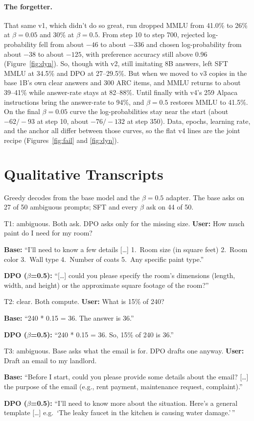 \documentclass[11pt]{article}
\newcommand{\usr}[1]{\textbf{User:} #1\par}
\newcommand{\base}[1]{\textbf{Base:} #1\par}
\newcommand{\dpo}[1]{\textbf{DPO ($\beta$=0.5):} #1\par}
\begin{document}
\paragraph{The forgetter.}
That same v1, which didn't do so great, run dropped MMLU from 41.0\% to 26\% at $\beta{=}0.05$ and 30\% at $\beta{=}0.5$.
From step 10 to step 700, rejected log-probability fell from about $-46$ to about $-336$ and chosen log-probability from about $-38$ to about $-125$, with preference accuracy still above 0.96 (Figure~\ref{fig:dyn}).
So, though with v2, still imitating 8B answers, left SFT MMLU at 34.5\% and DPO at 27--29.5\%.
But when we moved to v3 copies in the base 1B's own clear answers and 300 ARC items, and MMLU returns to about 39--41\% while answer-rate stays at 82--88\%.
Until finally with v4's 259 Alpaca instructions bring the answer-rate to 94\%, and $\beta{=}0.5$ restores MMLU to 41.5\%.
On the final $\beta{=}0.05$ curve the log-probabilities stay near the start (about $-62/-93$ at step 10, about $-76/-132$ at step 350).
Data, epochs, learning rate, and the anchor all differ between those curves, so the flat v4 lines are the joint recipe (Figures~\ref{fig:fail} and \ref{fig:dyn}).

\section{Qualitative Transcripts}
\label{sec:transcripts}

Greedy decodes from the base model and the $\beta{=}0.5$ adapter. The base asks on 27 of 50 ambiguous prompts; SFT and every $\beta$ ask on 44 of 50.

\begin{transcript}{T1: ambiguous. Both ask. DPO asks only for the missing size.}
\usr{How much paint do I need for my room?}
\base{``I'll need to know a few details [\dots] 1.~Room size (in square feet) 2.~Room color 3.~Wall type 4.~Number of coats 5.~Any specific paint type.''}
\dpo{``[\dots] could you please specify the room's dimensions (length, width, and height) or the approximate square footage of the room?''}
\end{transcript}

\begin{transcript}{T2: clear. Both compute.}
\usr{What is 15\% of 240?}
\base{``240 * 0.15 = 36. The answer is 36.''}
\dpo{``240 * 0.15 = 36. So, 15\% of 240 is 36.''}
\end{transcript}

\begin{transcript}{T3: ambiguous. Base asks what the email is for. DPO drafts one anyway.}
\usr{Draft an email to my landlord.}
\base{``Before I start, could you please provide some details about the email? [\dots] the purpose of the email (e.g., rent payment, maintenance request, complaint).''}
\dpo{``I'll need to know more about the situation. Here's a general template [\dots] e.g.\ `The leaky faucet in the kitchen is causing water damage.'\,''}
\end{transcript}
\end{document}
